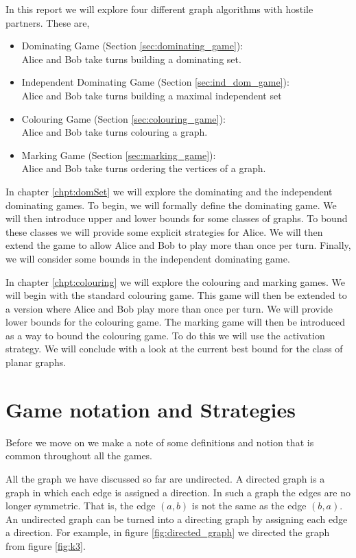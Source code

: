 In this report 
we will explore four different graph algorithms with hostile partners. These are,
\begin{itemize}
    \item Dominating Game (Section \ref{sec:dominating_game}): \\
        Alice and Bob take turns building a dominating set.
    \item Independent Dominating Game (Section \ref{sec:ind_dom_game}): \\
        Alice and Bob take turns building a maximal independent set    
    \item Colouring Game (Section \ref{sec:colouring_game}): \\
        Alice and Bob take turns colouring a graph.
    \item Marking Game (Section \ref{sec:marking_game}): \\
        Alice and Bob take turns ordering the vertices of a graph.
\end{itemize}

In chapter \ref{chpt:domSet} we will explore the dominating and the independent dominating games. To begin, we  will formally define the dominating game. We will then introduce upper and lower bounds for some classes of graphs. To bound these classes we will provide some explicit strategies for Alice. We will then extend the game to allow Alice and Bob to play more than once per turn. Finally, we will consider some bounds in the independent dominating game.

In chapter \ref{chpt:colouring} we will explore the colouring and marking games. We will begin with the standard colouring game. This game will then be extended to a version where Alice and Bob play more than once per turn. We will provide lower bounds for the colouring game. The marking game will then be introduced as a way to bound the colouring game. To do this we will use the activation strategy. We will conclude with a look at the current best bound for the class of planar graphs.
    

\section{Game notation and Strategies}
    
Before we move on we make a note of some definitions and notion that is common throughout all the games.
    
All the graph we have discussed so far are undirected. A directed graph is a graph in which each edge is assigned a direction. In such a graph the edges are no longer symmetric. That is, the edge $(a,b)$ is not the same as the edge $(b,a)$. An undirected graph can be turned into a directing graph by assigning each edge a direction. For example, in figure \ref{fig:directed_graph} we directed the graph from figure \ref{fig:k3}. 

